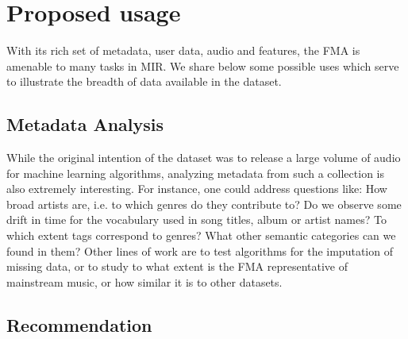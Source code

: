 \documentclass{article}
\begin{document}
\section{Proposed usage} %


With its rich set of metadata, user data, audio and features, the FMA is amenable to many tasks in MIR. We share below some possible uses which serve to illustrate the breadth of data available in the dataset.





\subsection{Metadata Analysis}

While the original intention of the dataset was to release a large volume of audio for machine learning algorithms, analyzing metadata from such a collection is also extremely interesting.
For instance, one could address questions like: How broad artists are, i.e. to which genres do they contribute to? Do we observe some drift in time for the vocabulary used in song titles, album or artist names? To which extent tags correspond to genres? What other semantic categories can we found in them?
Other lines of work are to test algorithms for the imputation of missing data, or to study to what extent is the FMA representative of mainstream music, or how similar it is to other datasets.

\subsection{Recommendation} %
\end{document}
